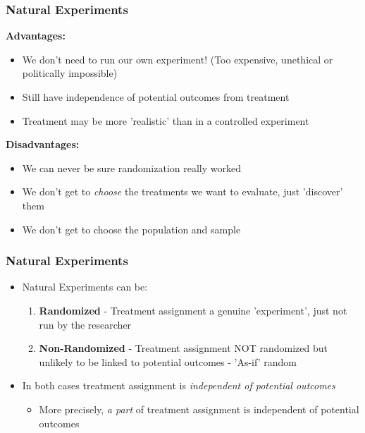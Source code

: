 \documentclass[xcolor=x11names,compress]{beamer}\usepackage[]{graphicx}\usepackage[]{color}
\renewcommand{\(}{\begin{columns}}
\renewcommand{\)}{\end{columns}}
\newcommand{\<}[1]{\begin{column}{#1}}
\renewcommand{\>}{\end{column}}
\begin{document}
\begin{frame}
\frametitle{Natural Experiments}
\begin{multicols}{2}
\textbf{Advantages:}
\begin{itemize}
\item We don't need to run our own experiment! (Too expensive, unethical or politically impossible)
\pause
\item Still have independence of potential outcomes from treatment
\pause
\item Treatment may be more 'realistic' than in a controlled experiment
\pause
\end{itemize}
\columnbreak
\textbf{Disadvantages:}
\begin{itemize}
\item We can never be sure randomization really worked
\pause
\item We don't get to \textit{choose} the treatments we want to evaluate, just 'discover' them
\pause
\item We don't get to choose the population and sample
\end{itemize}
\end{multicols}
\end{frame}

\begin{frame}
\frametitle{Natural Experiments}
\begin{itemize}
\item Natural Experiments can be:
\pause
\begin{enumerate}
\item \textbf{Randomized} - Treatment assignment a genuine 'experiment', just not run by the researcher
\pause
\item \textbf{Non-Randomized} - Treatment assignment NOT randomized but unlikely to be linked to potential outcomes - 'As-if' random
\pause
\end{enumerate}
\item In both cases treatment assignment is \textit{independent of potential outcomes}
\begin{itemize}
\item More precisely, \textit{a part} of treatment assignment is independent of potential outcomes
\end{itemize}
\end{itemize}
\end{frame}
\end{document}
